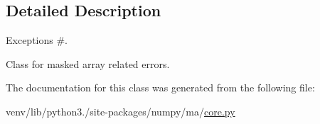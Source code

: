 \subsection{Detailed Description}
Exceptions \#. 

\begin{DoxyVerb}Class for masked array related errors.\end{DoxyVerb}
 

The documentation for this class was generated from the following file\+:\begin{DoxyCompactItemize}
\item 
venv/lib/python3./site-\/packages/numpy/ma/\hyperlink{numpy_2ma_2core_8py}{core.\+py}\end{DoxyCompactItemize}
